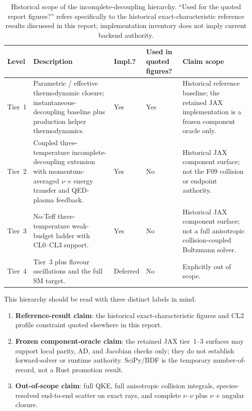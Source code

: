 \begin{table}[t]
\centering
\small
\caption{Historical scope of the incomplete-decoupling hierarchy. ``Used for the quoted report figures?'' refers specifically to the historical exact-characteristic reference results discussed in this report; implementation inventory does not imply current backend authority.}\label{tab:decoupling_scope}
\begin{tabularx}{\textwidth}{p{1.35cm}X>{\centering\arraybackslash}p{1.35cm}>{\centering\arraybackslash}p{1.8cm}p{3.0cm}}
\toprule
Level & Description & Impl.? & Used in quoted figures? & Claim scope \\
\midrule
Tier~1 & Parametric / effective thermodynamic closure; instantaneous-decoupling baseline plus production helper thermodynamics. & Yes & Yes & Historical reference baseline; the retained JAX implementation is a frozen component oracle only. \\
Tier~2 & Coupled three-temperature incomplete-decoupling extension with momentum-averaged $\nu$--$e$ energy transfer and QED-plasma feedback. & Yes & No & Historical JAX component surface; not the F09 collision or endpoint authority. \\
Tier~3 & No-Teff three-temperature weak-budget ladder with CL0--CL3 support. & Yes & No & Historical JAX component surface; not a full anisotropic collision-coupled Boltzmann solver. \\
Tier~4 & Tier~3 plus flavour oscillations and the full SM target. & Deferred & No & Explicitly out of scope. \\
\bottomrule
\end{tabularx}
\normalsize
\end{table}

This hierarchy should be read with three distinct labels in mind.
\begin{enumerate}
\item \textbf{Reference-result claim}: the historical exact-characteristic figures and CL2 profile constraint quoted elsewhere in this report.
\item \textbf{Frozen component-oracle claim}: the retained JAX tier~1--3 surfaces may support local parity, AD, and Jacobian checks only; they do not establish forward-solver or runtime authority.  SciPy/BDF is the temporary number-of-record, not a Rust promotion result.
\item \textbf{Out-of-scope claim}: full QKE, full anisotropic collision integrals, species-resolved end-to-end scatter on exact rays, and complete $\nu$--$\nu$ plus $\nu$--$e$ angular closure.
\end{enumerate}

